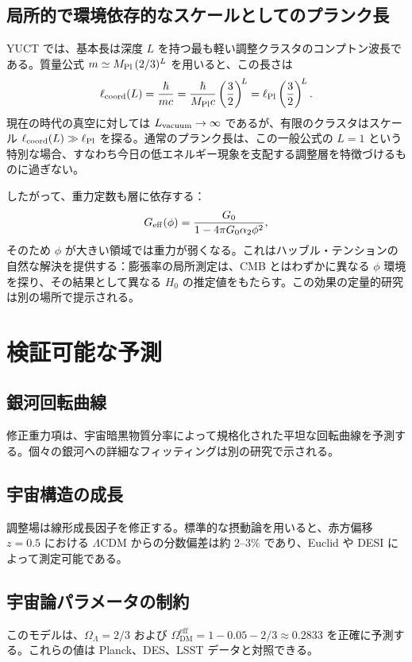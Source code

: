 \documentclass[12pt,a4paper]{article}
\begin{document}
	\subsection{局所的で環境依存的なスケールとしてのプランク長}
	YUCT では、基本長は深度 \(L\) を持つ最も軽い調整クラスタのコンプトン波長である。質量公式 \(m \simeq M_{\rm Pl}\,(2/3)^L\) を用いると、この長さは
	\begin{equation}
		\ell_{\rm coord}(L) = \frac{\hbar}{m c}
		= \frac{\hbar}{M_{\rm Pl}c} \left(\frac{3}{2}\right)^{\!L}
		= \ell_{\rm Pl} \left(\frac{3}{2}\right)^{\!L}.
		\label{eq:length-from-L}
	\end{equation}
	現在の時代の真空に対しては \(L_{\rm vacuum}\to\infty\) であるが、有限のクラスタはスケール \(\ell_{\rm coord}(L) \gg \ell_{\rm Pl}\) を探る。通常のプランク長は、この一般公式の \(L=1\) という特別な場合、すなわち今日の低エネルギー現象を支配する調整層を特徴づけるものに過ぎない。
	
	したがって、重力定数も層に依存する：
	\begin{equation}
		G_{\rm eff}(\phi) = \frac{G_0}{1-4\pi G_0\alpha_2\phi^2},
		\label{eq:Geff-layer}
	\end{equation}
	そのため \(\phi\) が大きい領域では重力が弱くなる。これはハッブル・テンションの自然な解決を提供する：膨張率の局所測定は、CMB とはわずかに異なる \(\phi\) 環境を探り、その結果として異なる \(H_0\) の推定値をもたらす。この効果の定量的研究は別の場所で提示される。
	
	\section{検証可能な予測}
	
	\subsection{銀河回転曲線}
	修正重力項は、宇宙暗黒物質分率によって規格化された平坦な回転曲線を予測する。個々の銀河への詳細なフィッティングは別の研究で示される。
	
	\subsection{宇宙構造の成長}
	調整場は線形成長因子を修正する。標準的な摂動論を用いると、赤方偏移 \(z=0.5\) における \(\Lambda\)CDM からの分数偏差は約 \(2\)–\(3\%\) であり、Euclid や DESI によって測定可能である。
	
	\subsection{宇宙論パラメータの制約}
	このモデルは、\(\Omega_\Lambda = 2/3\) および \(\Omega_{\mathrm{DM}}^{\mathrm{eff}} = 1 - 0.05 - 2/3 \approx 0.2833\) を正確に予測する。これらの値は Planck、DES、LSST データと対照できる。
	
\end{document}
